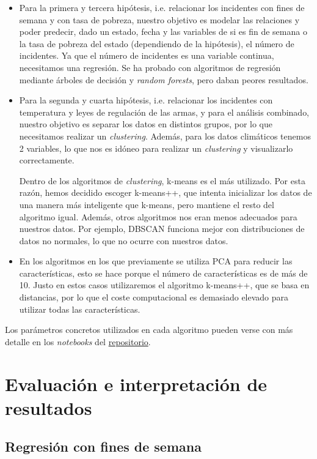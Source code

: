 \documentclass[11pt,a4paper]{article}
\begin{document}
\begin{itemize}
    \item Para la primera y tercera hipótesis, i.e. relacionar los incidentes con fines de semana y con tasa de pobreza, nuestro objetivo es modelar las relaciones y poder predecir, dado un estado, fecha y las variables de si es fin de semana o la tasa de pobreza del estado (dependiendo de la hipótesis), el número de incidentes. Ya que el número de incidentes es una variable continua, necesitamos una regresión. Se ha probado con algoritmos de regresión mediante árboles de decisión y \textit{random forests}, pero daban peores resultados.
    \item Para la segunda y cuarta hipótesis, i.e. relacionar los incidentes con temperatura y leyes de regulación de las armas, y para el análisis combinado, nuestro objetivo es separar los datos en distintos grupos, por lo que necesitamos realizar un \textit{clustering}. Además, para los datos climáticos tenemos 2 variables, lo que nos es idóneo para realizar un \textit{clustering} y visualizarlo correctamente.
    
    Dentro de los algoritmos de \textit{clustering}, k-means es el más utilizado. Por esta razón, hemos decidido escoger k-means++, que intenta inicializar los datos de una manera más inteligente que k-means, pero mantiene el resto del algoritmo igual. Además, otros algoritmos nos eran menos adecuados para nuestros datos. Por ejemplo, DBSCAN funciona mejor con distribuciones de datos no normales, lo que no ocurre con nuestros datos.
    
    \item En los algoritmos en los que previamente se utiliza PCA para reducir las características, esto se hace porque el número de características es de más de 10. Justo en estos casos utilizaremos el algoritmo k-means++, que se basa en distancias, por lo que el coste computacional es demasiado elevado para utilizar todas las características.
\end{itemize}

Los parámetros concretos utilizados en cada algoritmo pueden verse con más detalle en los \textit{notebooks} del \href{https://github.com/israelMateos/analisis-violencia-armas}{repositorio}.

\section{Evaluación e interpretación de resultados}

\subsection{Regresión con fines de semana}
\end{document}
